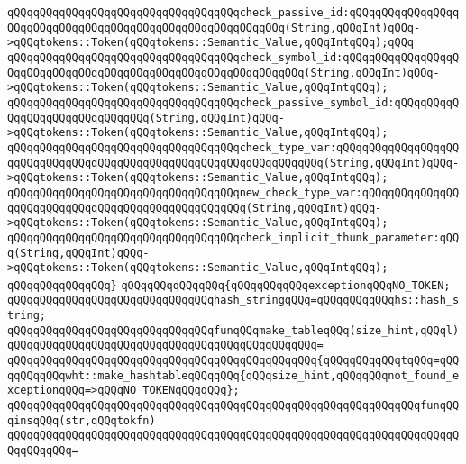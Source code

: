 \verb|qQQqqQQqqQQqqQQqqQQqqQQqqQQqqQQqqQQqcheck_passive_id:qQQqqQQqqQQqqQQqqQQqqQQqqQQqqQQqqQQqqQQqqQQqqQQqqQQqqQQqqQQq(String,qQQqInt)qQQq->qQQqtokens::Token(qQQqtokens::Semantic_Value,qQQqIntqQQq);qQQq|\newline
\verb|qQQqqQQqqQQqqQQqqQQqqQQqqQQqqQQqqQQqcheck_symbol_id:qQQqqQQqqQQqqQQqqQQqqQQqqQQqqQQqqQQqqQQqqQQqqQQqqQQqqQQqqQQqqQQq(String,qQQqInt)qQQq->qQQqtokens::Token(qQQqtokens::Semantic_Value,qQQqIntqQQq);|\newline
\verb|qQQqqQQqqQQqqQQqqQQqqQQqqQQqqQQqqQQqcheck_passive_symbol_id:qQQqqQQqqQQqqQQqqQQqqQQqqQQqqQQq(String,qQQqInt)qQQq->qQQqtokens::Token(qQQqtokens::Semantic_Value,qQQqIntqQQq);|\newline
\verb|qQQqqQQqqQQqqQQqqQQqqQQqqQQqqQQqqQQqcheck_type_var:qQQqqQQqqQQqqQQqqQQqqQQqqQQqqQQqqQQqqQQqqQQqqQQqqQQqqQQqqQQqqQQqqQQq(String,qQQqInt)qQQq->qQQqtokens::Token(qQQqtokens::Semantic_Value,qQQqIntqQQq);|\newline
\verb|qQQqqQQqqQQqqQQqqQQqqQQqqQQqqQQqqQQqnew_check_type_var:qQQqqQQqqQQqqQQqqQQqqQQqqQQqqQQqqQQqqQQqqQQqqQQqqQQq(String,qQQqInt)qQQq->qQQqtokens::Token(qQQqtokens::Semantic_Value,qQQqIntqQQq);|\newline
\verb|qQQqqQQqqQQqqQQqqQQqqQQqqQQqqQQqqQQqcheck_implicit_thunk_parameter:qQQq(String,qQQqInt)qQQq->qQQqtokens::Token(qQQqtokens::Semantic_Value,qQQqIntqQQq);|\newline
\verb|qQQqqQQqqQQqqQQq}|\newline
\newline
\verb|qQQqqQQqqQQqqQQq{qQQqqQQqqQQqexceptionqQQqNO_TOKEN;|\newline
\newline
\verb|qQQqqQQqqQQqqQQqqQQqqQQqqQQqqQQqhash_stringqQQq=qQQqqQQqqQQqhs::hash_string;|\newline
\newline
\verb|qQQqqQQqqQQqqQQqqQQqqQQqqQQqqQQqfunqQQqmake_tableqQQq(size_hint,qQQql)|\newline
\verb|qQQqqQQqqQQqqQQqqQQqqQQqqQQqqQQqqQQqqQQqqQQqqQQq=|\newline
\verb|qQQqqQQqqQQqqQQqqQQqqQQqqQQqqQQqqQQqqQQqqQQqqQQq{qQQqqQQqqQQqtqQQq=qQQqqQQqqQQqwht::make_hashtableqQQqqQQq{qQQqsize_hint,qQQqqQQqnot_found_exceptionqQQq=>qQQqNO_TOKENqQQqqQQq};|\newline
\newline
\verb|qQQqqQQqqQQqqQQqqQQqqQQqqQQqqQQqqQQqqQQqqQQqqQQqqQQqqQQqqQQqqQQqfunqQQqinsqQQq(str,qQQqtokfn)|\newline
\verb|qQQqqQQqqQQqqQQqqQQqqQQqqQQqqQQqqQQqqQQqqQQqqQQqqQQqqQQqqQQqqQQqqQQqqQQqqQQqqQQq=|\newline

